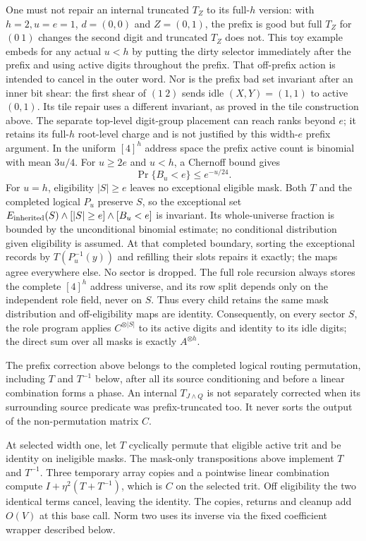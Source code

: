 One must not repair an internal truncated $T_Z$ to its full-$h$
version: with $h=2,u=e=1$, $d=(0,0)$ and $Z=(0,1)$, the prefix is
good but full $T_Z$ for $(0\ 1)$ changes the second digit and truncated
$T_Z$ does not. This toy example embeds for any actual $u<h$ by
putting the dirty selector immediately after the prefix and
using active digits throughout the prefix.
That off-prefix action is intended to cancel in the
outer word. Nor is the prefix bad set invariant after an inner bit
shear: the first shear of $(1\ 2)$ sends idle $(X,Y)=(1,1)$ to active
$(0,1)$. Its tile repair uses a different invariant, as proved in the tile construction above.
The separate top-level digit-group placement can reach ranks beyond
$e$; it retains its full-$h$ root-level charge and is not justified
by this width-$e$ prefix argument.
In the uniform $[4]^h$
address space the prefix active count is
binomial with mean $3u/4$. For $u\ge2e$ and $u<h$, a Chernoff bound gives
\begin{equation}
 \Pr\{B_u<e\}\le e^{-u/24}.                            \label{eq:router-15}
\end{equation}
For $u=h$, eligibility $|S|\ge e$ leaves no exceptional eligible mask.
Both $T$ and the completed logical $P_u$ preserve $S$, so the
exceptional set
$E_{\rm inherited}(S)\wedge[|S|\ge e]\wedge[B_u<e]$ is invariant.
Its whole-universe fraction is bounded by the unconditional binomial
estimate; no conditional distribution given eligibility is assumed.
At that completed boundary, sorting the exceptional records by
$T(P_u^{-1}(y))$ and refilling their slots repairs it exactly;
the maps agree everywhere else. No sector is dropped. The full role recursion always
stores the complete $[4]^h$ address universe, and its row split depends
only on the independent role field, never on $S$. Thus every child
retains the same mask distribution and off-eligibility maps are identity.
Consequently, on every sector $S$, the role program applies
$C^{\otimes |S|}$ to its active digits and identity to its idle digits;
the direct sum over all masks is exactly $A^{\otimes h}$.

The prefix correction above belongs to the completed logical routing
permutation, including $T$ and $T^{-1}$ below, after all its source
conditioning and before a linear combination forms a phase. An
internal $T_{J\wedge Q}$ is not separately corrected when its surrounding
source predicate was prefix-truncated too. It never sorts the output
of the non-permutation matrix $C$.

At selected width one, let $T$ cyclically permute that eligible active
trit and be identity on ineligible masks. The mask-only transpositions
above implement $T$ and $T^{-1}$. Three temporary array copies and a
pointwise linear combination compute
$I+\eta^2(T+T^{-1})$, which is $C$ on the selected trit. Off eligibility
the two identical terms cancel, leaving the identity. The copies,
returns and cleanup add $O(V)$ at this base call. Norm two uses its
inverse via the fixed coefficient wrapper described below.

